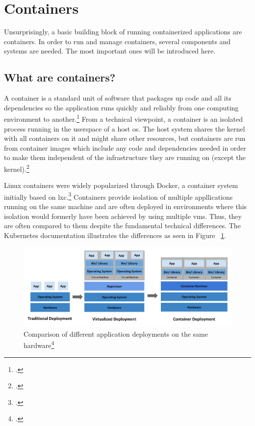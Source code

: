 \section{Containers}

Unsurprisingly, a basic building block of running containerized applications are containers.
In order to run and manage containers, several components and systems are needed. The most important ones will be introduced here.

\subsection{What are containers?}
A container is a standard unit of software that packages up code and all its dependencies so the application runs quickly and reliably from one computing environment to another.\footcite{whatContainer}
From a technical viewpoint, a container is an isolated process running in the userspace of a host \gls{os}. The host system shares the kernel with all containers on it and might share other resources, but containers are run from container images which include any code and dependencies needed in order to make them independent of the infrastructure they are running on (except the kernel).\footcite{containerIntro}

Linux containers were widely popularized through Docker, a container system initially based on \gls{lxc}.\footcite{containerHistory}
Containers provide isolation of multiple appllications running on the same machine and are often deployed in environments where this isolation would formerly have been achieved by using multiple \gls{vm}s. Thus, they are often compared to them despite the fundamental technical differences. The Kubernetes documentation illustrates the differences as seen in Figure ~\ref{fig:VMsVsContainers}.

\begin{figure}[H]
\includegraphics[scale=0.3]{pictures/VMsVsContainers.jpg} 
\caption{Comparison of different application deployments on the same hardware\protect\footcite{k8sDocsVmsContainers}}
\label{fig:VMsVsContainers}
\end{figure}


